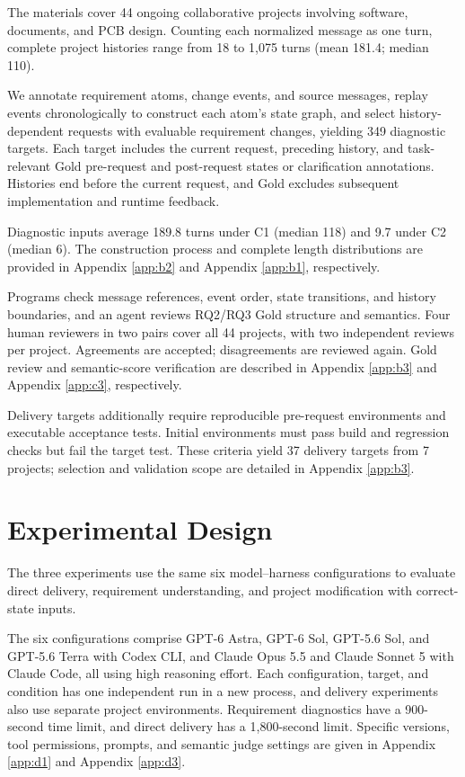 \documentclass{article} %
\begin{document}
The materials cover 44 ongoing collaborative projects involving software, documents, and PCB design. Counting each normalized message as one turn, complete project histories range from 18 to 1,075 turns (mean 181.4; median 110).

We annotate requirement atoms, change events, and source messages, replay events chronologically to construct each atom's state graph, and select history-dependent requests with evaluable requirement changes, yielding 349 diagnostic targets. Each target includes the current request, preceding history, and task-relevant Gold pre-request and post-request states or clarification annotations. Histories end before the current request, and Gold excludes subsequent implementation and runtime feedback.

Diagnostic inputs average 189.8 turns under C1 (median 118) and 9.7 under C2 (median 6). The construction process and complete length distributions are provided in Appendix \ref{app:b2} and Appendix \ref{app:b1}, respectively.

Programs check message references, event order, state transitions, and history boundaries, and an agent reviews RQ2/RQ3 Gold structure and semantics. Four human reviewers in two pairs cover all 44 projects, with two independent reviews per project. Agreements are accepted; disagreements are reviewed again. Gold review and semantic-score verification are described in Appendix \ref{app:b3} and Appendix \ref{app:c3}, respectively.

Delivery targets additionally require reproducible pre-request environments and executable acceptance tests. Initial environments must pass build and regression checks but fail the target test. These criteria yield 37 delivery targets from 7 projects; selection and validation scope are detailed in Appendix \ref{app:b3}.

\section{Experimental Design}
\label{sec:experimental-design}
\label{sec:experiments}

The three experiments use the same six model--harness configurations to evaluate direct delivery, requirement understanding, and project modification with correct-state inputs.

The six configurations comprise GPT-6 Astra, GPT-6 Sol, GPT-5.6 Sol, and GPT-5.6 Terra with Codex CLI, and Claude Opus 5.5 and Claude Sonnet 5 with Claude Code, all using high reasoning effort. Each configuration, target, and condition has one independent run in a new process, and delivery experiments also use separate project environments. Requirement diagnostics have a 900-second time limit, and direct delivery has a 1,800-second limit. Specific versions, tool permissions, prompts, and semantic judge settings are given in Appendix \ref{app:d1} and Appendix \ref{app:d3}.
\end{document}
